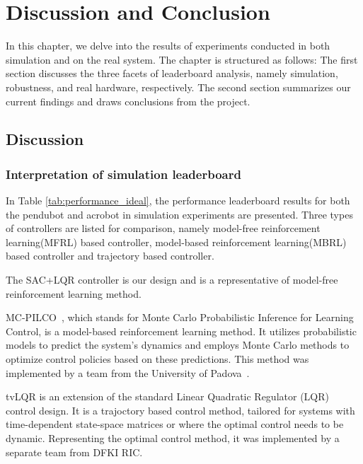 \chapter{Discussion and Conclusion}
In this chapter, we delve into the results of experiments conducted in both simulation and on the real system. The chapter is structured as follows: The first section discusses the three facets of leaderboard analysis, namely simulation, robustness, and real hardware, respectively. The second section summarizes our current findings and draws conclusions from the project.

\section{Discussion}
\subsection{Interpretation of simulation leaderboard}
In Table \ref{tab:performance_ideal}, the performance leaderboard results for both the pendubot and acrobot in simulation experiments are presented. Three types of controllers are listed for comparison, namely model-free reinforcement learning(MFRL) based controller, model-based reinforcement learning(MBRL) based controller and trajectory based controller.

The SAC+LQR controller is our design and is a representative of model-free reinforcement learning method. 

MC-PILCO~\cite{amadio2022model}, which stands for Monte Carlo Probabilistic Inference for Learning Control, is a model-based reinforcement learning method. It utilizes probabilistic models to predict the system's dynamics and employs Monte Carlo methods to optimize control policies based on these predictions. This method was implemented by a team from the University of Padova~\cite{Libera2023AthleticIO}. 

tvLQR is an extension of the standard Linear Quadratic Regulator (LQR) control design. It is a trajoctory based control method, tailored for systems with time-dependent state-space matrices or where the optimal control needs to be dynamic. Representing the optimal control method, it was implemented by a separate team from DFKI RIC\cite{2023_ram_wiebe_double_pendulum}.

